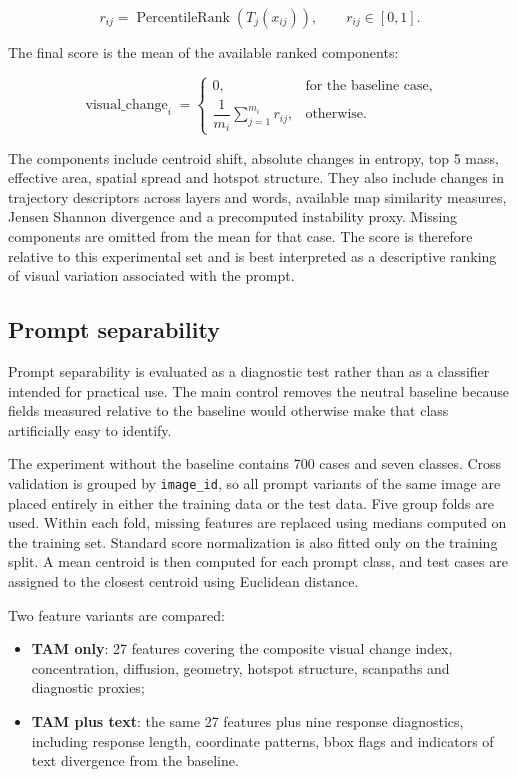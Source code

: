 \documentclass[11pt,a4paper]{article}
\newcommand{\code}[1]{\texttt{\small #1}}
\begin{document}
\begin{equation}
r_{ij} = \operatorname{PercentileRank}\left(T_j(x_{ij})\right), \qquad r_{ij} \in [0,1].
\end{equation}

The final score is the mean of the available ranked components:

\begin{equation}
\operatorname{visual\_change}_i =
\begin{cases}
0, & \text{for the baseline case},\\[3pt]
\dfrac{1}{m_i}\displaystyle\sum_{j=1}^{m_i} r_{ij}, & \text{otherwise}.
\end{cases}
\end{equation}

The components include centroid shift, absolute changes in entropy, top 5 mass, effective area, spatial spread and hotspot structure. They also include changes in trajectory descriptors across layers and words, available map similarity measures, Jensen Shannon divergence and a precomputed instability proxy. Missing components are omitted from the mean for that case. The score is therefore relative to this experimental set and is best interpreted as a descriptive ranking of visual variation associated with the prompt.

\subsection{Prompt separability}

Prompt separability is evaluated as a diagnostic test rather than as a classifier intended for practical use. The main control removes the neutral baseline because fields measured relative to the baseline would otherwise make that class artificially easy to identify.

The experiment without the baseline contains 700 cases and seven classes. Cross validation is grouped by \code{image\_id}, so all prompt variants of the same image are placed entirely in either the training data or the test data. Five group folds are used. Within each fold, missing features are replaced using medians computed on the training set. Standard score normalization is also fitted only on the training split. A mean centroid is then computed for each prompt class, and test cases are assigned to the closest centroid using Euclidean distance.

Two feature variants are compared:

\begin{itemize}
  \item \textbf{TAM only}: 27 features covering the composite visual change index, concentration, diffusion, geometry, hotspot structure, scanpaths and diagnostic proxies;
  \item \textbf{TAM plus text}: the same 27 features plus nine response diagnostics, including response length, coordinate patterns, bbox flags and indicators of text divergence from the baseline.
\end{itemize}
\end{document}
